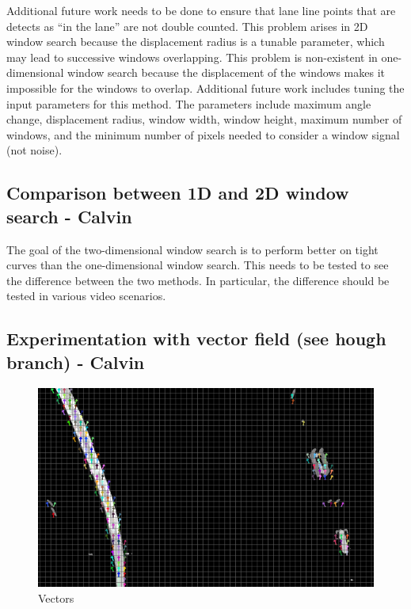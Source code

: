 \documentclass[twoside,twocolumn]{article}
\begin{document}
\par Additional future work needs to be done to ensure that lane line points that are detects as “in the lane” are not double counted. This problem arises in 2D window search because the displacement radius is a tunable parameter, which may lead to successive windows overlapping. This problem is non-existent in one-dimensional window search because the displacement of the windows makes it impossible for the windows to overlap. Additional future work includes tuning the input parameters for this method. The parameters include maximum angle change, displacement radius, window width, window height, maximum number of windows, and the minimum number of pixels needed to consider a window signal (not noise).

\subsection{Comparison between 1D and 2D window search - Calvin}
\par The goal of the two-dimensional window search is to perform better on tight curves than the one-dimensional window search. This needs to be tested to see the difference between the two methods. In particular, the difference should be tested in various video scenarios.


\subsection{Experimentation with vector field (see hough branch) - Calvin}
\begin{figure}
  \includegraphics[width=\linewidth]{calvin5.png}
  \caption{Vectors}
  \label{fig:vectors}
\end{figure}
\end{document}
